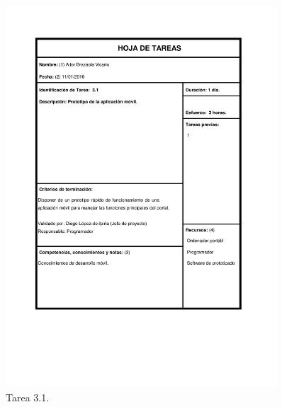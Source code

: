 \documentclass{DeustoFDP}
\begin{document}
\begin{figure}[H]
    \centering
    \includegraphics[width=0.9\textwidth]{fig/Tareas/31}
    \caption{Tarea 3.1.}
    \label{fig:t31}
\end{figure}
\end{document}
